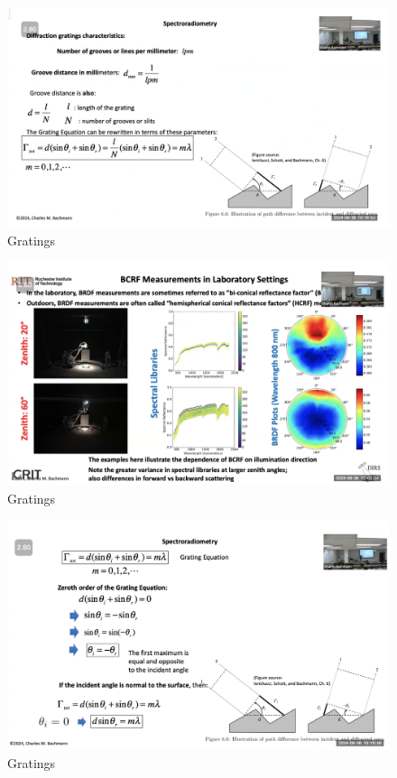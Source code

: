 \documentclass{article}
\begin{document}
\begin{figure}[h!]
\centering
\includegraphics[scale=.4]{Radiometry/Week5/Notes/Gratings/MUM6.png}
\caption{Gratings}
\label{fig:Blackbody}
\end{figure}

\begin{figure}[h!]
\centering
\includegraphics[scale=.4]{Radiometry/Week5/Notes/Gratings/MUM1.png}
\caption{Gratings}
\label{fig:Blackbody}
\end{figure}

\begin{figure}[h!]
\centering
\includegraphics[scale=.4]{Radiometry/Week5/Notes/Gratings/MUM7.png}
\caption{Gratings}
\label{fig:Blackbody}
\end{figure}
\end{document}
